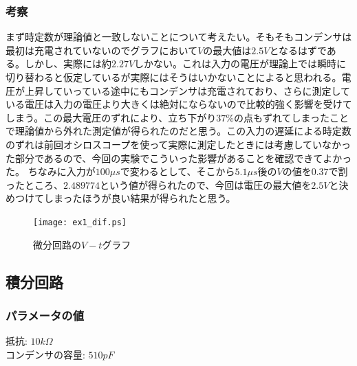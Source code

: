 \documentclass{jsarticle}
\begin{document}
\subsubsection{考察}
まず時定数が理論値と一致しないことについて考えたい。そもそもコンデンサは最初は充電されていないのでグラフにおいて$V$の最大値は$2.5V$となるはずである。しかし、実際には約$2.27V$しかない。これは入力の電圧が理論上では瞬時に切り替わると仮定しているが実際にはそうはいかないことによると思われる。電圧が上昇していっている途中にもコンデンサは充電されており、さらに測定している電圧は入力の電圧より大きくは絶対にならないので比較的強く影響を受けてしまう。この最大電圧のずれにより、立ち下がり$37\%$の点もずれてしまったことで理論値から外れた測定値が得られたのだと思う。この入力の遅延による時定数のずれは前回オシロスコープを使って実際に測定したときには考慮していなかった部分であるので、今回の実験でこういった影響があることを確認できてよかった。
ちなみに入力が$100\mu s$で変わるとして、そこから$5.1\mu s$後の$V$の値を$0.37$で割ったところ、$2.489774$という値が得られたので、今回は電圧の最大値を$2.5V$と決めつけてしまったほうが良い結果が得られたと思う。

\begin{figure}[H]
    \hspace{50pt}
    \texttt{[image: ex1\_dif.ps]}
    \vspace{30pt}
    \caption{微分回路の$V-t$グラフ}
\end{figure}

\subsection{積分回路}

\subsubsection{パラメータの値}
\begin{flushleft}
抵抗: $10k\Omega$\\
コンデンサの容量: $510pF$
\end{flushleft}
\end{document}
